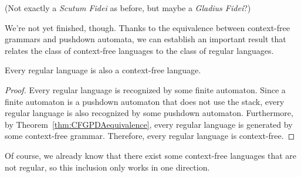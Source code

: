 \begin{center}
\end{center}

\noindent
(Not exactly a \textit{Scutum Fidei} as before, but maybe a \textit{Gladius Fidei}?)

We're not yet finished, though. Thanks to the equivalence between context-free grammars and pushdown automata, we can establish an important result that relates the class of context-free languages to the class of regular languages.

\begin{theorem}\label{thm:regulariscontextfree}
Every regular language is also a context-free language.

\begin{proof}
Every regular language is recognized by some finite automaton. Since a finite automaton is a pushdown automaton that does not use the stack, every regular language is also recognized by some pushdown automaton. Furthermore, by Theorem~\ref{thm:CFGPDAequivalence}, every regular language is generated by some context-free grammar. Therefore, every regular language is context-free.
\end{proof}
\end{theorem}

Of course, we already know that there exist some context-free languages that are not regular, so this inclusion only works in one direction.
